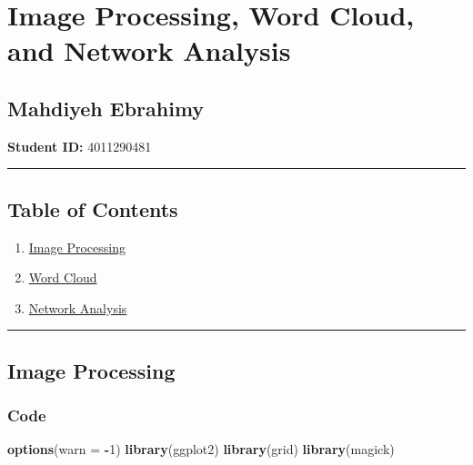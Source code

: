 \documentclass[
]{article}
\author{}
\date{\vspace{-2.5em}}
\newenvironment{Shaded}{\begin{snugshade}}{\end{snugshade}}
\newcommand{\AttributeTok}[1]{\textcolor[rgb]{0.13,0.29,0.53}{#1}}
\newcommand{\DecValTok}[1]{\textcolor[rgb]{0.00,0.00,0.81}{#1}}
\newcommand{\FunctionTok}[1]{\textcolor[rgb]{0.13,0.29,0.53}{\textbf{#1}}}
\newcommand{\NormalTok}[1]{#1}
\newcommand{\SpecialCharTok}[1]{\textcolor[rgb]{0.81,0.36,0.00}{\textbf{#1}}}
\providecommand{\tightlist}{%
  \setlength{\itemsep}{0pt}\setlength{\parskip}{0pt}}
\begin{document}
\hypertarget{image-processing-word-cloud-and-network-analysis}{%
\section{Image Processing, Word Cloud, and Network
Analysis}\label{image-processing-word-cloud-and-network-analysis}}

\hypertarget{mahdiyeh-ebrahimy}{%
\subsection{Mahdiyeh Ebrahimy}\label{mahdiyeh-ebrahimy}}

\textbf{Student ID:} 4011290481

\begin{center}\rule{0.5\linewidth}{0.5pt}\end{center}

\hypertarget{table-of-contents}{%
\subsection{Table of Contents}\label{table-of-contents}}

\begin{enumerate}
\def\labelenumi{\arabic{enumi}.}
\tightlist
\item
  \protect\hyperlink{image-processing}{Image Processing}\\
\item
  \protect\hyperlink{word-cloud}{Word Cloud}\\
\item
  \protect\hyperlink{network-analysis}{Network Analysis}
\end{enumerate}

\begin{center}\rule{0.5\linewidth}{0.5pt}\end{center}

\hypertarget{image-processing}{%
\subsection{Image Processing}\label{image-processing}}

\hypertarget{code}{%
\subsubsection{Code}\label{code}}

\begin{Shaded}
\begin{Highlighting}[]
\FunctionTok{options}\NormalTok{(}\AttributeTok{warn =} \SpecialCharTok{{-}}\DecValTok{1}\NormalTok{)}
\FunctionTok{library}\NormalTok{(ggplot2)}
\FunctionTok{library}\NormalTok{(grid)}
\FunctionTok{library}\NormalTok{(magick)}
\end{Highlighting}
\end{Shaded}
\end{document}
